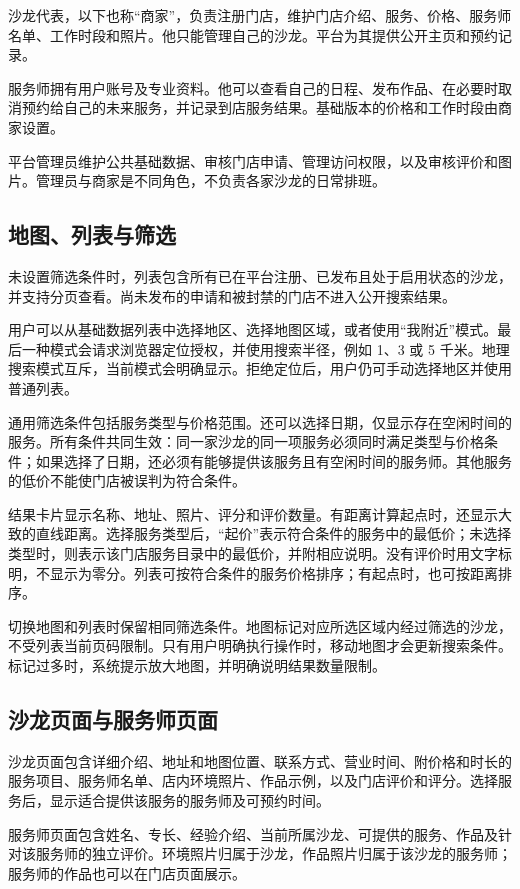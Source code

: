 沙龙代表，以下也称“商家”，负责注册门店，维护门店介绍、服务、价格、服务师名单、工作时段和照片。他只能管理自己的沙龙。平台为其提供公开主页和预约记录。

服务师拥有用户账号及专业资料。他可以查看自己的日程、发布作品、在必要时取消预约给自己的未来服务，并记录到店服务结果。基础版本的价格和工作时段由商家设置。

平台管理员维护公共基础数据、审核门店申请、管理访问权限，以及审核评价和图片。管理员与商家是不同角色，不负责各家沙龙的日常排班。

\subsection{地图、列表与筛选}
未设置筛选条件时，列表包含所有已在平台注册、已发布且处于启用状态的沙龙，并支持分页查看。尚未发布的申请和被封禁的门店不进入公开搜索结果。

用户可以从基础数据列表中选择地区、选择地图区域，或者使用“我附近”模式。最后一种模式会请求浏览器定位授权，并使用搜索半径，例如 1、3 或 5 千米。地理搜索模式互斥，当前模式会明确显示。拒绝定位后，用户仍可手动选择地区并使用普通列表。

通用筛选条件包括服务类型与价格范围。还可以选择日期，仅显示存在空闲时间的服务。所有条件共同生效：同一家沙龙的同一项服务必须同时满足类型与价格条件；如果选择了日期，还必须有能够提供该服务且有空闲时间的服务师。其他服务的低价不能使门店被误判为符合条件。

结果卡片显示名称、地址、照片、评分和评价数量。有距离计算起点时，还显示大致的直线距离。选择服务类型后，“起价”表示符合条件的服务中的最低价；未选择类型时，则表示该门店服务目录中的最低价，并附相应说明。没有评价时用文字标明，不显示为零分。列表可按符合条件的服务价格排序；有起点时，也可按距离排序。

切换地图和列表时保留相同筛选条件。地图标记对应所选区域内经过筛选的沙龙，不受列表当前页码限制。只有用户明确执行操作时，移动地图才会更新搜索条件。标记过多时，系统提示放大地图，并明确说明结果数量限制。

\subsection{沙龙页面与服务师页面}
沙龙页面包含详细介绍、地址和地图位置、联系方式、营业时间、附价格和时长的服务项目、服务师名单、店内环境照片、作品示例，以及门店评价和评分。选择服务后，显示适合提供该服务的服务师及可预约时间。

服务师页面包含姓名、专长、经验介绍、当前所属沙龙、可提供的服务、作品及针对该服务师的独立评价。环境照片归属于沙龙，作品照片归属于该沙龙的服务师；服务师的作品也可以在门店页面展示。

